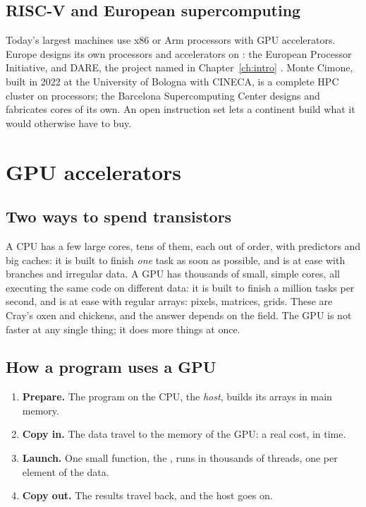 \subsection{RISC-V and European supercomputing}

Today's largest machines use x86 or Arm processors with GPU accelerators.
Europe designs its own processors and accelerators on \riscv: the European
Processor Initiative, and DARE, the project named in
Chapter~\ref{ch:intro} \citep{eurohpcdare}. Monte Cimone, built in 2022 at
the University of Bologna with CINECA, is a complete HPC cluster on \riscv
processors; the Barcelona Supercomputing Center designs and fabricates
\riscv cores of its own. An open instruction set lets a continent build what
it would otherwise have to buy.

\section{GPU accelerators}

\subsection{Two ways to spend transistors}

A CPU has a few large cores, tens of them, each out of order, with predictors
and big caches: it is built to finish \emph{one} task as soon as possible,
and is at ease with branches and irregular data. A GPU has thousands of
small, simple cores, all executing the same code on different data: it is
built to finish a million tasks per second, and is at ease with regular
arrays: pixels, matrices, grids. These are Cray's oxen and chickens, and the
answer depends on the field. The GPU is not faster at any single thing; it
does more things at once.

\subsection{How a program uses a GPU}

\begin{enumerate}
\item \textbf{Prepare.} The program on the CPU, the \emph{host}, builds its
  arrays in main memory.
\item \textbf{Copy in.} The data travel to the memory of the GPU: a real cost,
  in time.
\item \textbf{Launch.} One small function, the , runs in
  thousands of threads, one per element of the data.
\item \textbf{Copy out.} The results travel back, and the host goes on.
\end{enumerate}

